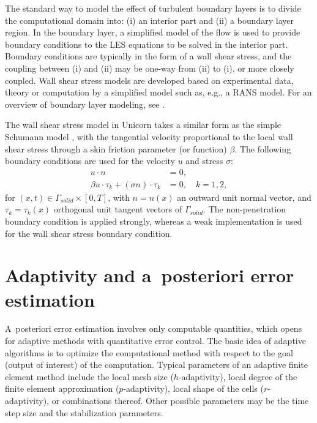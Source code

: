 The standard way to model the effect of turbulent boundary layers is
to divide the computational domain into: (i) an interior part and (ii)
a boundary layer region. In the boundary layer, a simplified model of
the flow is used to provide boundary conditions to the LES equations
to be solved in the interior part. Boundary conditions are typically
in the form of a wall shear stress, and the coupling between (i) and
(ii) may be one-way from (ii) to (i), or more closely coupled. Wall
shear stress models are developed based on experimental data, theory
or computation by a simplified model such as, e.g., a RANS model. For
an overview of boundary layer modeling,
see \citet{SagautDeckTerracol2006,PiomelliBalaras2002}.

The wall shear stress model in Unicorn takes a similar form as the
simple Schumann model \citep{Schumann1975}, with the tangential
velocity proportional to the local wall shear stress through a skin
friction parameter (or function) $\beta$. The following boundary
conditions are used for the velocity $u$ and stress $\sigma$:
\begin{align}
u\cdot n &= 0, \label{hoffman-1:slfra} \\
\beta u\cdot \tau_k + (\sigma n) \cdot \tau_k &= 0, \quad k=1,2, \label{hoffman-1:slfrb}
\end{align}
for $(x,t)\in \Gamma_{solid}\times [0,T]$, with $n=n(x)$ an outward
unit normal vector, and $\tau_k=\tau_k(x)$ orthogonal unit tangent vectors
of $\Gamma_{solid}$. The non-penetration boundary condition is applied
strongly, whereas a weak implementation is used for the wall shear
stress boundary condition.

\section{Adaptivity and a~posteriori error estimation}

A~posteriori error estimation involves only computable quantities,
which opens for adaptive methods with quantitative error control. The
basic idea of adaptive algorithms is to optimize the computational
method with respect to the goal (output of interest) of the
computation. Typical parameters of an adaptive finite element method
include the local mesh size ($h$-adaptivity), local degree of the
finite element approximation ($p$-adaptivity), local shape of the
cells ($r$-adaptivity), or combinations thereof. Other possible
parameters may be the time step size and the stabilization parameters.

